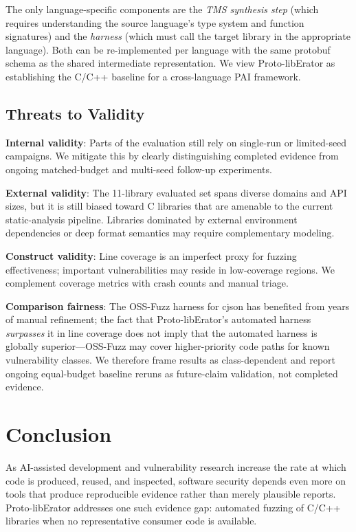 \documentclass[sigconf,anonymous]{acmart}
\begin{document}
The only language-specific components are the \emph{TMS synthesis step}
(which requires understanding the source language's type system and
function signatures) and the \emph{harness} (which must call the target
library in the appropriate language).  Both can be re-implemented per
language with the same protobuf schema as the shared intermediate
representation.  We view Proto-libErator as establishing the C/C++
baseline for a cross-language PAI framework.

\subsection{Threats to Validity}
\label{sec:threats}

\textbf{Internal validity}: Parts of the evaluation still rely on single-run
or limited-seed campaigns. We mitigate this by clearly distinguishing completed
evidence from ongoing matched-budget and multi-seed follow-up experiments.

\textbf{External validity}: The 11-library evaluated set spans diverse domains
and API sizes, but it is still biased toward C libraries that are amenable to
the current static-analysis pipeline. Libraries dominated by external
environment dependencies or deep format semantics may require complementary
modeling.

\textbf{Construct validity}: Line coverage is an imperfect proxy for
fuzzing effectiveness; important vulnerabilities may reside in
low-coverage regions.  We complement coverage metrics with crash counts
and manual triage.

\textbf{Comparison fairness}: The OSS-Fuzz harness for cjson has benefited
from years of manual refinement; the fact that Proto-libErator's automated
harness \emph{surpasses} it in line coverage does not imply that the
automated harness is globally superior---OSS-Fuzz may cover
higher-priority code paths for known vulnerability classes. We therefore frame
results as class-dependent and report ongoing equal-budget baseline reruns as
future-claim validation, not completed evidence.

\section{Conclusion}
\label{sec:conclusion}

As AI-assisted development and vulnerability research increase the rate at
which code is produced, reused, and inspected, software security depends
even more on tools that produce reproducible evidence rather than merely
plausible reports.  Proto-libErator addresses one such evidence gap:
automated fuzzing of C/C++ libraries when no representative consumer code
is available.
\end{document}
